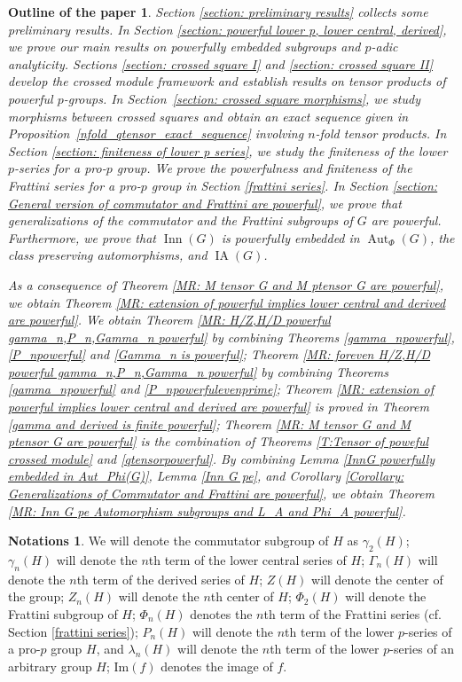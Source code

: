 \documentclass[12pt]{elsarticle}
\newtheorem*{outline}{Outline of the paper}
\newtheorem*{main corollary*}{Main Corollary}
\theoremstyle{definition}
\newtheorem*{Notations}{Notations}
\newcommand{\im}[1]{\text{Im}{(#1)}}
\begin{document}
\begin{outline}

    Section \ref{section: preliminary results} collects  some preliminary results. In Section \ref{section: powerful lower p, lower central, derived}, we prove our main results on powerfully embedded subgroups and $p$-adic analyticity.  Sections \ref{section: crossed square I} and \ref{section: crossed square II} develop the crossed module framework and establish results on tensor products of powerful $p$-groups. In Section~\ref{section: crossed square morphisms}, we study morphisms between crossed squares and obtain an exact sequence given in Proposition~\ref{nfold_qtensor_exact_sequence} involving $n$-fold tensor products. In Section \ref{section: finiteness of lower p series}, we study the finiteness of the lower $p$-series for a pro-$p$ group. We prove the powerfulness and finiteness of the Frattini series for a pro-$p$ group in Section \ref{frattini series}.  In Section 
    \ref{section: General version of commutator and Frattini are powerful}, we prove that generalizations of the commutator and the Frattini subgroups of $G$ are powerful. Furthermore, we prove that $\operatorname{Inn}(G)$ is powerfully embedded in $\operatorname{Aut}_\Phi(G)$, the class preserving automorphisms, and $\operatorname{IA}(G)$.
    
    As a consequence of Theorem \ref{MR: M tensor G and M ptensor G are powerful}, we obtain Theorem \ref{MR: extension of powerful implies lower central and derived are powerful}.
We obtain Theorem \ref{MR: H/Z,H/D powerful gamma_n,P_n,Gamma_n powerful} by combining  Theorems \ref{gamma_npowerful}, \ref{P_npowerful} and \ref{Gamma_n is powerful}; Theorem \ref{MR: foreven H/Z,H/D powerful gamma_n,P_n,Gamma_n powerful} by combining Theorems \ref{gamma_npowerful} and \ref{P_npowerfulevenprime}; Theorem \ref{MR: extension of powerful implies lower central and derived are powerful} is proved in Theorem \ref{gamma and derived is finite powerful}; Theorem \ref{MR: M tensor G and M ptensor G are powerful} is the combination of Theorems \ref{T:Tensor of poweful crossed module} and \ref{qtensorpowerful}. By combining Lemma \ref{InnG powerfully embedded in Aut_Phi(G)}, Lemma \ref{Inn G pe}, and Corollary 
\ref{Corollary: Generalizations of Commutator and Frattini are powerful},
we obtain Theorem \ref{MR: Inn G pe Automorphism subgroups and L_A and Phi_A powerful}.

\end{outline}

\begin{Notations} We will denote the commutator subgroup of $H$ as $\gamma_2(H)$; $\gamma_n(H)$ will denote the $n$th term of the lower central series of $H$; $\Gamma_n(H)$ will denote the $n$th term of the derived series of $H$; $Z(H)$ will denote the center of the group; $Z_n(H)$ will denote the $n$th center of $H$; $\Phi_2(H)$ will denote the Frattini subgroup of $H$; $\Phi_n(H)$ denotes the $n$th term of the Frattini series (cf. Section \ref{frattini series}); $P_n(H)$ will denote the $n$th term of the lower $p$-series of a pro-$p$ group $H$, and  $\lambda_n(H)$ will denote the $n$th term of the lower $p$-series of an arbitrary group $H$; $\im{f}$ denotes the image of $f$.
\end{Notations}
\end{document}

